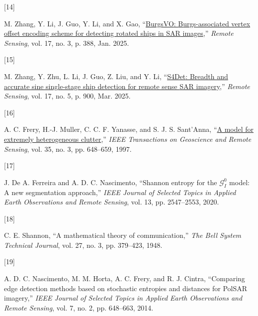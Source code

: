 \documentclass[
  lettersize  journal,
]{IEEEtran}%
\newlength{\cslhangindent}
\newlength{\csllabelwidth}
\newenvironment{CSLReferences}[2] %
 {\begin{list}{}{%
  \setlength{\itemindent}{0pt}
  \setlength{\leftmargin}{0pt}
  \setlength{\parsep}{0pt}
  \ifodd #1
   \setlength{\leftmargin}{\cslhangindent}
   \setlength{\itemindent}{-1\cslhangindent}
  \fi
  \setlength{\itemsep}{#2\baselineskip}}}
 {\end{list}}
\newcommand{\CSLLeftMargin}[1]{\parbox[t]{\csllabelwidth}{\strut#1\strut}}
\newcommand{\CSLRightInline}[1]{\parbox[t]{\linewidth - \csllabelwidth}{\strut#1\strut}}
\providecommand{\DIFaddbegin}{} %
\providecommand{\DIFaddend}{} %
\providecommand{\DIFdelbegin}{} %
\providecommand{\DIFdelend}{} %
\providecommand{\DIFscaledelfig}{0.5}
\newlength{\DIFdelgraphicswidth} %
\newlength{\DIFdelgraphicsheight} %
\providecommand{\DIFaddincludegraphics}[2][]{{\color{blue}\fbox{\DIFOincludegraphics[#1]{#2}}}} %
\providecommand{\DIFdelincludegraphics}[2][]{%
\sbox{\DIFdelgraphicsbox}{\DIFOincludegraphics[#1]{#2}}%
\settoboxwidth{\DIFdelgraphicswidth}{\DIFdelgraphicsbox} %
\settoboxtotalheight{\DIFdelgraphicsheight}{\DIFdelgraphicsbox} %
\scalebox{\DIFscaledelfig}{%
\parbox[b]{\DIFdelgraphicswidth}{\usebox{\DIFdelgraphicsbox}\\[-\baselineskip] \rule{\DIFdelgraphicswidth}{0em}}\llap{\resizebox{\DIFdelgraphicswidth}{\DIFdelgraphicsheight}{%
\setlength{\unitlength}{\DIFdelgraphicswidth}%
\begin{picture}(1,1)%
\thicklines\linethickness{2pt} %
{\color[rgb]{1,0,0}\put(0,0){\framebox(1,1){}}}%
{\color[rgb]{1,0,0}\put(0,0){\line( 1,1){1}}}%
{\color[rgb]{1,0,0}\put(0,1){\line(1,-1){1}}}%
\end{picture}%
}\hspace*{3pt}}} %
} %
\DeclareRobustCommand{\DIFaddbegin}{\DIFOaddbegin \let\includegraphics\DIFaddincludegraphics} %
\DeclareRobustCommand{\DIFaddend}{\DIFOaddend \let\includegraphics\DIFOincludegraphics} %
\DeclareRobustCommand{\DIFdelbegin}{\DIFOdelbegin \let\includegraphics\DIFdelincludegraphics} %
\DeclareRobustCommand{\DIFdelend}{\DIFOaddend \let\includegraphics\DIFOincludegraphics} %
\begin{document}
\begin{CSLReferences}{0}{0}
\CSLLeftMargin{{[}14{]} }%
\CSLRightInline{M. Zhang, Y. Li, J. Guo, Y. Li, and X. Gao,
{``\href{https://doi.org/10.3390/rs17030388}{{BurgsVO}:
{B}urgs-associated vertex offset encoding scheme for detecting rotated
ships in {SAR} images},''} \emph{Remote Sensing}, vol. 17, no. 3, p.
388, Jan. 2025. }

\CSLLeftMargin{{[}15{]} }%
\CSLRightInline{M. Zhang, Y. Zhu, L. Li, J. Guo, Z. Liu, and Y. Li,
{``\href{https://doi.org/10.3390/rs17050900}{{S4Det}: Breadth and
accurate sine single-stage ship detection for remote sense {SAR}
imagery},''} \emph{Remote Sensing}, vol. 17, no. 5, p. 900, Mar. 2025. }

\CSLLeftMargin{{[}16{]} }%
\DIFaddend \CSLRightInline{A. C. Frery, H.-J. Muller, C. C. F. Yanasse, and S. J.
S. Sant'Anna, {``\href{https://doi.org/10.1109/36.581981}{A model for
extremely heterogeneous clutter},''} \emph{{IEEE} Transactions on
Geoscience and Remote Sensing}, vol. 35, no. 3, pp. 648--659, 1997. }

\DIFdelbegin %
\DIFdelend \DIFaddbegin \CSLLeftMargin{{[}17{]} }\DIFaddend %
\CSLRightInline{J. De A. Ferreira and A. D. C. Nascimento, {``Shannon
entropy for the {\(\mathcal {G}^0_{I}\)} model: A new segmentation
approach,''} \emph{{IEEE} Journal of Selected Topics in Applied Earth
Observations and Remote Sensing}, vol. 13, pp. 2547--2553, 2020. }

\DIFdelbegin %
\DIFdelend \DIFaddbegin \CSLLeftMargin{{[}18{]} }\DIFaddend %
\CSLRightInline{C. E. Shannon, {``A mathematical theory of
communication,''} \emph{The Bell System Technical Journal}, vol. 27, no.
3, pp. 379--423, 1948. }

\DIFdelbegin %
\DIFdelend \DIFaddbegin \CSLLeftMargin{{[}19{]} }\DIFaddend %
\CSLRightInline{A. D. C. Nascimento, M. M. Horta, A. C. Frery, and R. J.
Cintra, {``Comparing edge detection methods based on stochastic
entropies and distances for {PolSAR} imagery,''} \emph{{IEEE} Journal of
Selected Topics in Applied Earth Observations and Remote Sensing}, vol.
7, no. 2, pp. 648--663, 2014. }


\end{CSLReferences}
\end{document}
